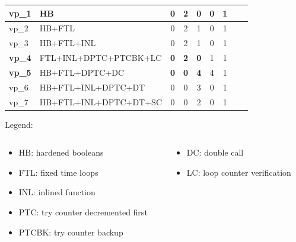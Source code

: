 \begin{frame}[fragile]
\begin{small}
\begin{tiny}
{\begin{table}[htb]
\begin{tabular}{|l|l|c|c|c|c|c|c|c|}
                        \hline
                        vp\_1  \hfil & HB \hfil & 0     & 2 & 0  & 0  & 1 \\
                        \hline
                        vp\_2  \hfil & HB+FTL\hfil & 0     & 2 & 1  & 0  & 1 \\
                        \hline
                        vp\_3 \hfil &  HB+FTL+INL\hfil & 0     & 2 & 1  & 0  & 1 \\
                        \hline
                        \textbf{vp\_4}  \hfil & FTL+INL+DPTC+PTCBK+LC\hfil & \textbf{0}     & \textbf{2} & \textbf{0}  & 1  & 1 \\
                        \hline
                        \textbf{vp\_5}  \hfil & HB+FTL+DPTC+DC\hfil & \textbf{0}     & \textbf{0} & \textbf{4}  & 4  & 1 \\
                        \hline
                        vp\_6  \hfil & HB+FTL+INL+DPTC+DT \hfil & 0     & 0 & 3  & 0  & 1 \\
                        \hline
                        vp\_7  \hfil & HB+FTL+INL+DPTC+DT+SC\hfil & 0     & 0 & 2  & 0  & 1 \\
                        \hline
                    \end{tabular}
                \end{table}
            }
             {
                Legend:
                \begin{columns}
                    \begin{column}{0.5\textwidth}
                        \begin{itemize}
                            \item HB: hardened booleans
                            \item FTL: fixed time loops
                            \item INL: inlined function
                            \item PTC: try counter decremented first
                            \item PTCBK: try counter backup
                        \end{itemize}  
                    \end{column}
                    \begin{column}{0.5\textwidth}
                        \begin{itemize}
                            \item DC: double call
                            \item LC: loop counter verification

\end{itemize}
\end{column}
\end{columns}}
\end{tiny}
\end{small}
\end{frame}
